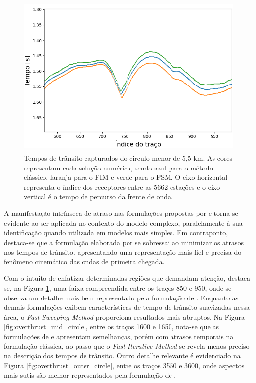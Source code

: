 \begin{figure}[H]
	\centering
	\includegraphics[height=8cm,width=13cm]{Imgs/Resultados/complex_w1.png}		
	\caption{Tempos de trânsito capturados do circulo menor de 5,5 km. As cores representam cada solução numérica, sendo azul para o método clássico, laranja para o FIM e verde para o FSM. O eixo horizontal representa o índice dos receptores entre as 5662 estações e o eixo vertical é o tempo de percurso da frente de onda.}
	\label{fig:overthrust_inner_circle}
\end{figure}

A manifestação intrínseca de atraso nas formulações propostas por  e  torna-se evidente ao ser aplicada no contexto do modelo complexo, paralelamente à sua identificação quando utilizada em modelos mais simples. Em contraponto, destaca-se que a formulação elaborada por  se sobressai ao minimizar os atrasos nos tempos de trânsito, apresentando uma representação mais fiel e precisa do fenômeno cinemático das ondas de primeira chegada.

Com o intuito de enfatizar determinadas regiões que demandam atenção, destaca-se, na Figura \ref{fig:overthrust_inner_circle}, uma faixa compreendida entre os traços 850 e 950, onde se observa um detalhe mais bem representado pela formulação de . Enquanto as demais formulações exibem características de tempo de trânsito suavizadas nessa área, o \textit{Fast Sweeping Method} proporciona resultados mais abruptos. Na Figura \ref{fig:overthrust_mid_circle}, entre os traços 1600 e 1650, nota-se que as formulações de  e  apresentam semelhanças, porém com atrasos temporais na formulação clássica, ao passo que o \textit{Fast Iterative Method} se revela menos preciso na descrição dos tempos de trânsito. Outro detalhe relevante é evidenciado na Figura \ref{fig:overthrust_outer_circle}, entre os traços 3550 e 3600, onde aspectos mais sutis são melhor representados pela formulação de .

